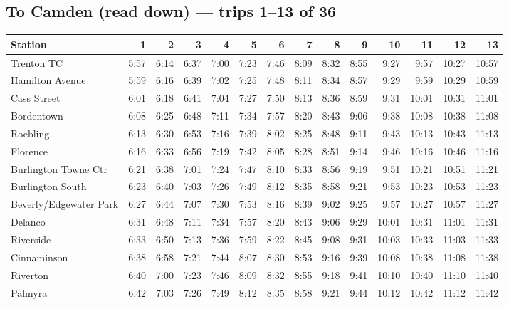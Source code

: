 \subsection*{To Camden (read down) --- trips 1--13 of 36}
\begin{center}\footnotesize\setlength{\tabcolsep}{3pt}\begin{tabular}{@{}lrrrrrrrrrrrrr@{}}\toprule
Station & 1 & 2 & 3 & 4 & 5 & 6 & 7 & 8 & 9 & 10 & 11 & 12 & 13 \\\midrule
Trenton TC & 5:57 & 6:14 & 6:37 & 7:00 & 7:23 & 7:46 & 8:09 & 8:32 & 8:55 & 9:27 & 9:57 & 10:27 & 10:57 \\
Hamilton Avenue & 5:59 & 6:16 & 6:39 & 7:02 & 7:25 & 7:48 & 8:11 & 8:34 & 8:57 & 9:29 & 9:59 & 10:29 & 10:59 \\
Cass Street & 6:01 & 6:18 & 6:41 & 7:04 & 7:27 & 7:50 & 8:13 & 8:36 & 8:59 & 9:31 & 10:01 & 10:31 & 11:01 \\
Bordentown & 6:08 & 6:25 & 6:48 & 7:11 & 7:34 & 7:57 & 8:20 & 8:43 & 9:06 & 9:38 & 10:08 & 10:38 & 11:08 \\
Roebling & 6:13 & 6:30 & 6:53 & 7:16 & 7:39 & 8:02 & 8:25 & 8:48 & 9:11 & 9:43 & 10:13 & 10:43 & 11:13 \\
Florence & 6:16 & 6:33 & 6:56 & 7:19 & 7:42 & 8:05 & 8:28 & 8:51 & 9:14 & 9:46 & 10:16 & 10:46 & 11:16 \\
Burlington Towne Ctr & 6:21 & 6:38 & 7:01 & 7:24 & 7:47 & 8:10 & 8:33 & 8:56 & 9:19 & 9:51 & 10:21 & 10:51 & 11:21 \\
Burlington South & 6:23 & 6:40 & 7:03 & 7:26 & 7:49 & 8:12 & 8:35 & 8:58 & 9:21 & 9:53 & 10:23 & 10:53 & 11:23 \\
Beverly/Edgewater Park & 6:27 & 6:44 & 7:07 & 7:30 & 7:53 & 8:16 & 8:39 & 9:02 & 9:25 & 9:57 & 10:27 & 10:57 & 11:27 \\
Delanco & 6:31 & 6:48 & 7:11 & 7:34 & 7:57 & 8:20 & 8:43 & 9:06 & 9:29 & 10:01 & 10:31 & 11:01 & 11:31 \\
Riverside & 6:33 & 6:50 & 7:13 & 7:36 & 7:59 & 8:22 & 8:45 & 9:08 & 9:31 & 10:03 & 10:33 & 11:03 & 11:33 \\
Cinnaminson & 6:38 & 6:58 & 7:21 & 7:44 & 8:07 & 8:30 & 8:53 & 9:16 & 9:39 & 10:08 & 10:38 & 11:08 & 11:38 \\
Riverton & 6:40 & 7:00 & 7:23 & 7:46 & 8:09 & 8:32 & 8:55 & 9:18 & 9:41 & 10:10 & 10:40 & 11:10 & 11:40 \\
Palmyra & 6:42 & 7:03 & 7:26 & 7:49 & 8:12 & 8:35 & 8:58 & 9:21 & 9:44 & 10:12 & 10:42 & 11:12 & 11:42 \\

\end{tabular}
\end{center}
